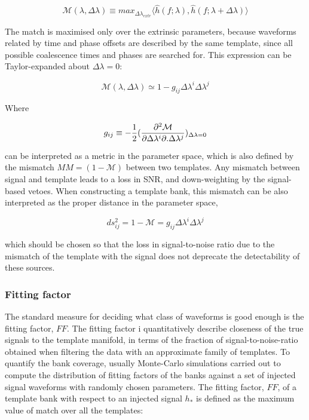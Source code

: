 \documentclass[binding=0.6cm, LaM]{sapthesis}
\begin{document}
		\begin{equation}
			\mathcal{M}(\lambda, \Delta \lambda) \equiv max_{\Delta \lambda_{extr}} \langle\hat h(f;\lambda), \hat h(f;\lambda + \Delta \lambda)  \rangle
		\end{equation}

	The match is maximised only over the extrinsic parameters, 
	because waveforms related by time and phase offsets
	are described by the same template, 
	since all possible coalescence times and phases are searched for.
	This expression can be Taylor-expanded about $\Delta \lambda = 0$:

		\begin{equation}
			\mathcal{M}(\lambda, \Delta \lambda) \simeq 1 - g_{ij} \Delta \lambda^i \Delta \lambda^j
		\end{equation}

	Where 

		\begin{equation}
			 g_{ij} \equiv -{1 \over 2} ({{\partial^2\mathcal{M}} \over {\partial  \Delta \lambda^i  \partial. \Delta \lambda^j}})_{\Delta \lambda = 0}
		\end{equation}

	can be interpreted as a metric in the parameter space, which is also defined
	by the mismatch $MM = (1 − \mathcal{M})$ between two templates.
	Any mismatch between signal and template leads to a loss in SNR, 
	and down-weighting by the signal-based vetoes. 
	When constructing a template bank, this mismatch can be also interpreted 
	as the proper distance in the parameter space,	

		\begin{equation}
			ds_{ij}^2 = 1 − \mathcal{M} = g_{ij} \Delta \lambda^i \Delta \lambda^j
		\end{equation}

	which should be chosen so that the loss in signal-to-noise ratio due to the mismatch 
	of the template with the signal does not deprecate the detectability of these sources.

\subsubsection{Fitting factor}

	The standard measure for deciding what class 
	of waveforms is good enough is the fitting factor, $FF$.
	The fitting factor i quantitatively describe closeness of 
	the true signals to the template manifold, in terms of the fraction of 
	signal-to-noise-ratio obtained when filtering 
	the data with an approximate family of templates. 
	To quantify the bank coverage, usually Monte-Carlo simulations carried out   
	to compute the distribution of fitting factors of the banks against 
	a set of injected signal waveforms with randomly chosen parameters. 
	The fitting factor, $FF$, of a template bank with respect to an injected signal $h_{*}$ 
	is defined as the maximum value of match over all the templates:
\end{document}

